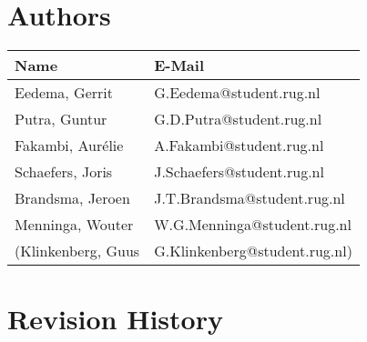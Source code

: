 \section*{Authors}

\begin{tabular}{L{} L{}}
	\textbf{Name}        & \textbf{E-Mail}               \\ \toprule
	Eedema, Gerrit       & G.Eedema@student.rug.nl       \\
	Putra, Guntur        & G.D.Putra@student.rug.nl      \\
	Fakambi, Aur\'{e}lie & A.Fakambi@student.rug.nl      \\
	Schaefers, Joris     & J.Schaefers@student.rug.nl    \\
	Brandsma, Jeroen     & J.T.Brandsma@student.rug.nl   \\
	Menninga, Wouter     & W.G.Menninga@student.rug.nl   \\ 
	(Klinkenberg, Guus   & G.Klinkenberg@student.rug.nl) \\ \bottomrule
\end{tabular}

\section*{Revision History}

